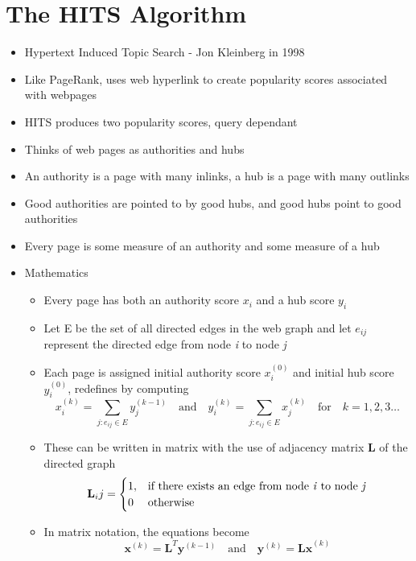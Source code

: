 \documentclass[11pt]{report}
\begin{document}
\section{The HITS Algorithm}
\begin{itemize}
\item Hypertext Induced Topic Search - Jon Kleinberg in 1998
\item Like PageRank, uses web hyperlink to create popularity scores associated with webpages
\item HITS produces two popularity scores, query dependant
\item Thinks of web pages as authorities and hubs
\item An authority is a page with many inlinks, a hub is a page with many outlinks
\item Good authorities are pointed to by good hubs, and good hubs point to good authorities
\item Every page is some measure of an authority and some measure of a hub
\item Mathematics
\begin{itemize}
\item Every page has both an authority score $x_i$ and a hub score $y_i$
\item Let E be the set of all directed edges in the web graph and let $e_{ij}$ represent the directed edge from node \textit{i} to node \textit{j}
\item Each page is assigned initial authority score $x_i^{(0)}$ and initial hub score $y_i^{(0)}$, redefines by computing \begin{equation}
x_i^{(k)} = \displaystyle \sum_{j:e_{ij}\in E} y_j^{(k-1)} \quad\mathrm{and}\quad y_i^{(k)} = \displaystyle \sum_{j:e_{ij}\in E} x_j^{(k)}  \quad\mathrm{for}\quad k=1,2,3\ldots
\end{equation}
\item These can be written in matrix with the use of adjacency matrix \textbf{L} of the directed graph \begin{equation}
\textbf{L}_ij = \begin{cases} 1, & \textnormal{if there exists an edge from node \textit{i} to node \textit{j}}\\ 0 & \textnormal{otherwise}
\end{cases}
\end{equation}
\item In matrix notation, the equations become \begin{equation}
\textbf{x}^{(k)} = \textbf{L}^T\textbf{y}^{(k-1)}\quad\mathrm{and}\quad \textbf{y}^{(k)}=\textbf{Lx}^{(k)}

\end{equation}
\end{itemize}
\end{itemize}
\end{document}
